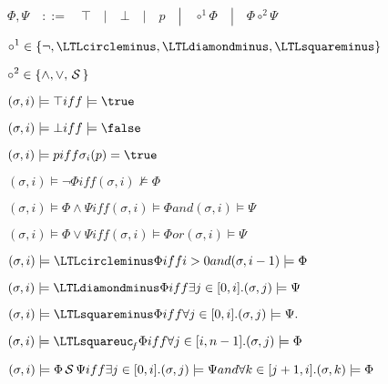 \documentclass[multi={mymath},border=1pt]{standalone}
\newenvironment{mymath}{$\displaystyle}{$}
\begin{document}
\begin{mymath}
  \Phi,\Psi  \quad::=\quad \top\quad|\quad \bot\quad|\quad p \quad|\quad  \circ^{1} \Phi \quad|\quad \Phi \circ^{2} \Psi
\end{mymath}

\begin{mymath}
  \circ^{1}\in\{\neg, \yesterday, \once, \historically\}
\end{mymath}

\begin{mymath}
  \circ^{2}\in\{\wedge,\vee, \since\}
\end{mymath}


\begin{mymath}
  (\sigma,i)\models\top iff \models\true
\end{mymath}

\begin{mymath}
  (\sigma,i)\models\bot iff  \models\false
\end{mymath}

\begin{mymath}
  (\sigma,i)\models p iff \sigma_i(p) = \true
\end{mymath}

\begin{mymath}
  (\sigma,i)\models \neg \Phi iff  (\sigma,i)\not\models\Phi
\end{mymath}

\begin{mymath}
  (\sigma,i)\models\Phi\wedge \Psi iff  (\sigma,i)\models\Phi  and (\sigma, i)\models\Psi
\end{mymath}

\begin{mymath}
  (\sigma,i)\models\Phi\vee \Psi iff  (\sigma,i)\models\Phi  or (\sigma, i)\models\Psi
\end{mymath}

\begin{mymath}
  (\sigma,i)\models \yesterday \Phi iff  i>0 and (\sigma,{i-1})\models\Phi
\end{mymath}

\begin{mymath}
  (\sigma,i)\models \once \Phi iff  \exists j\in[0, i].(\sigma, {j}) \models\Psi
\end{mymath}

\begin{mymath}
  (\sigma,i)\models \historically \Phi  iff  \forall j\in[0, i].(\sigma, {j}) \models\Psi.
\end{mymath}

\begin{mymath}
  (\sigma,i)\models \globally\Phi  iff  \forall j\in[i, n-1].(\sigma, {j})\models\Phi
\end{mymath}

\begin{mymath}
  (\sigma,i)\models \Phi \since \Psi  iff \exists j\in[0, i].(\sigma, {j})\models\Psi and \forall k\in[j+1, i].(\sigma, k)\models\Phi
\end{mymath}
\end{document}
